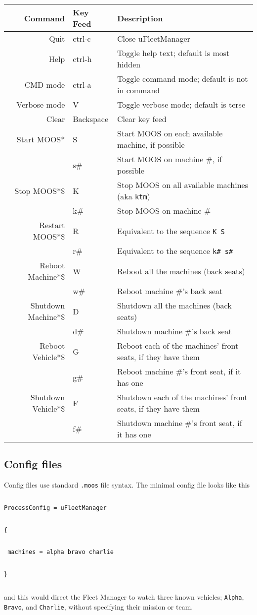 \documentclass[11pt]{article}
\newcommand{\cmdline}[1]{\vspace{.2em} $\:$\\ \begin{minipage}{\dimexpr\textwidth-2cm}
\texttt{#1}
\end{minipage} $\:$\\ \vspace{-.2em} }
\begin{document}
\begin{tabular}{r|ll}
Command & Key Feed & Description\\
\hline
Quit & ctrl-c & Close uFleetManager\\
Help & ctrl-h & Toggle help text; default is most hidden\\
CMD mode & ctrl-a & Toggle command mode; default is not in command\\
Verbose mode & V & Toggle verbose mode; default is terse\\
Clear & Backspace & Clear key feed\\ 
Start MOOS* & S & Start MOOS on each available machine, if possible\\
& s\# & Start MOOS on machine \#, if possible\\
Stop MOOS*\$ & K & Stop MOOS on all available machines (aka \texttt{ktm})\\
& k\# & Stop MOOS on machine \#\\
Restart MOOS*\$ & R & Equivalent to the sequence \texttt{K S}\\
& r\# & Equivalent to the sequence \texttt{k\# s\#}\\
Reboot Machine*\$ & W & Reboot all the machines (back seats)\\
& w\# & Reboot machine \#'s back seat\\
Shutdown Machine*\$ & D & Shutdown all the machines (back seats)\\
& d\# & Shutdown machine \#'s back seat\\
Reboot Vehicle*\$ & G & Reboot each of the machines' front seats, if they have them\\
& g\# & Reboot machine \#'s front seat, if it has one\\
Shutdown Vehicle*\$ & F & Shutdown each of the machines' front seats, if they have them\\
& f\# & Shutdown machine \#'s front seat, if it has one
\end{tabular}
\subsection{Config files}
Config files use standard \texttt{.moos} file syntax. The minimal config file looks like this

\cmdline{ProcessConfig = uFleetManager}
\cmdline{\{}
\cmdline{	machines = alpha bravo charlie}
\cmdline{\}}

and this would direct the Fleet Manager to watch three known vehicles; \texttt{Alpha}, \texttt{Bravo}, and \texttt{Charlie}, without specifying their mission or team.
\end{document}
